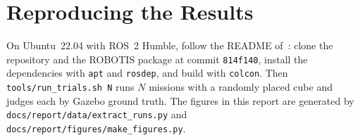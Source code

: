 \documentclass[journal]{IEEEtran}
\begin{document}
\section{Reproducing the Results}
On Ubuntu~22.04 with ROS~2 Humble, follow the README of~\cite{repo}: clone the repository and the ROBOTIS package at commit \texttt{814f140}, install the dependencies with \texttt{apt} and \texttt{rosdep}, and build with \texttt{colcon}. Then \texttt{tools/run\_trials.sh N} runs $N$ missions with a randomly placed cube and judges each by Gazebo ground truth. The figures in this report are generated by \texttt{docs/report/data/extract\_runs.py} and \texttt{docs/report/figures/make\_figures.py}.



\end{document}
